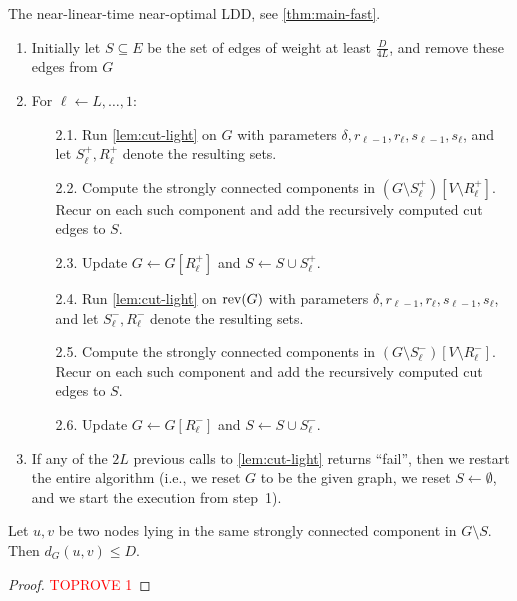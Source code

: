 \begin{algorithm}[t]
\caption{The near-linear-time near-optimal LDD, see \cref{thm:main-fast}.} \label{alg:ldd-fast}
\begin{enumerate}
    \item Initially let $S \subseteq E$ be the set of edges of weight at least $\frac{D}{4L}$, and remove these edges from $G$
    \item For $\ell \gets L, \dots, 1$:
    \begin{enumerate}
        \item[2.1.] Run \cref{lem:cut-light} on $G$ with parameters $\delta, r_{\ell-1}, r_\ell, s_{\ell-1}, s_{\ell}$, and let $S^+_\ell, R^+_\ell$ denote the resulting sets.
        \item[2.2.] Compute the strongly connected components in $(G \setminus S^+_\ell)[V \setminus R^+_\ell]$. Recur on each such component and add the recursively computed cut edges to $S$.
        \item[2.3.] Update $G \gets G[R^+_\ell]$ and $S \gets S \cup S^+_\ell$.
        \item[2.4.] Run \cref{lem:cut-light} on $\operatorname{rev}(G)$ with parameters $\delta, r_{\ell-1}, r_\ell, s_{\ell-1}, s_{\ell}$, and let $S^-_\ell, R^-_\ell$ denote the resulting sets.
        \item[2.5.] Compute the strongly connected components in $(G \setminus S^-_\ell)[V \setminus R^-_\ell]$. Recur on each such component and add the recursively computed cut edges to $S$.
        \item[2.6.] Update $G \gets G[R^-_\ell]$ and $S \gets S \cup S^-_\ell$.
    \end{enumerate}
    \item If any of the $2L$ previous calls to \cref{lem:cut-light} returns ``fail'', then we restart the entire algorithm (i.e., we reset $G$ to be the given graph, we reset $S \gets \emptyset$, and we start the execution from step~1).
\end{enumerate}
\end{algorithm}

\begin{lemma} \label{lem:ldd-fast-correctness}
Let $u, v$ be two nodes lying in the same strongly connected component in $G \setminus S$. Then $d_G(u, v) \leq D$.
\end{lemma}
\begin{proof}\textcolor{red}{TOPROVE 1}\end{proof}

